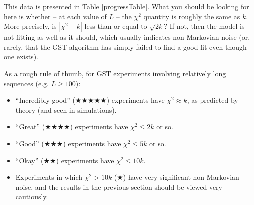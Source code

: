 \documentclass{article}[11pt]
\begin{document}
This data is presented in Table \ref{progressTable}.  What you should be looking for here is whether -- at each value of $L$ -- the $\chi^2$ quantity is roughly the same as $k$.  More precisely, is $|\chi^2-k|$ less than or equal to $\sqrt{2k}$?  If not, then the model is not fitting as well as it should, which usually indicates non-Markovian noise (or, rarely, that the GST algorithm has simply failed to find a good fit even though one exists).

As a rough rule of thumb, for GST experiments involving relatively long sequences (e.g. $L\geq100$):

\begin{itemize}
\item ``Incredibly good'' ($\bigstar\bigstar\bigstar\bigstar\bigstar$) experiments have $\chi^2 \approx k$, as predicted by theory (and seen in simulations).
\item ``Great'' ($\bigstar\bigstar\bigstar\bigstar$) experiments have $\chi^2 \leq 2k$ or so.
\item ``Good'' ($\bigstar\bigstar\bigstar$) experiments have $\chi^2 \leq 5k$ or so.
\item ``Okay'' ($\bigstar\bigstar$) experiments have $\chi^2 \leq 10k$.
\item Experiments in which $\chi^2 > 10k$ ($\bigstar$) have very significant non-Markovian noise, and the results in the previous section should be viewed very cautiously.
\end{itemize}
\end{document}
